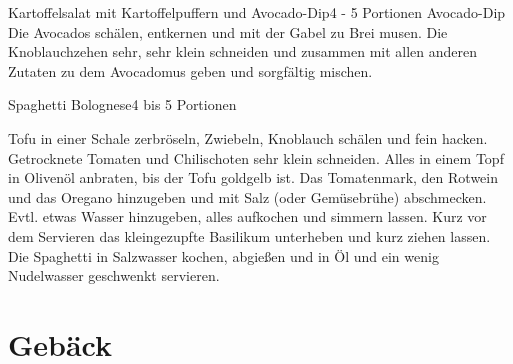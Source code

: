 \documentclass[a4paper,10pt]{article}
\begin{document}
\begin{recipe}{Kartoffelsalat mit Kartoffelpuffern und Avocado-Dip}{4 - 5 
    Portionen}{}
      \freeform Avocado-Dip 
      Die Avocados schälen, entkernen und mit der Gabel zu Brei musen.
      Die Knoblauchzehen sehr, sehr klein schneiden und zusammen mit allen anderen Zutaten zu dem 
      Avocadomus geben und sorgfältig mischen.  
 
    \end{recipe}
    
    \newpage
    
    \begin{recipe}{Spaghetti Bolognese}{4 bis 5 Portionen}{}
    
 
	Tofu in einer Schale zerbröseln, Zwiebeln, Knoblauch schälen und fein hacken.
        Getrocknete Tomaten und Chilischoten sehr klein schneiden. Alles in einem Topf in Olivenöl
        anbraten, bis der Tofu goldgelb ist.
	Das Tomatenmark, den Rotwein und das Oregano hinzugeben und mit Salz (oder Gemüsebrühe) abschmecken.
	Evtl. etwas Wasser hinzugeben, alles aufkochen und simmern lassen.
	Kurz vor dem Servieren das kleingezupfte Basilikum unterheben und kurz ziehen lassen.
        Die Spaghetti in Salzwasser kochen, abgießen und in Öl und ein wenig Nudelwasser geschwenkt servieren.
    \end{recipe}

    
    \newpage

    
    \section{Gebäck}
\end{document}
